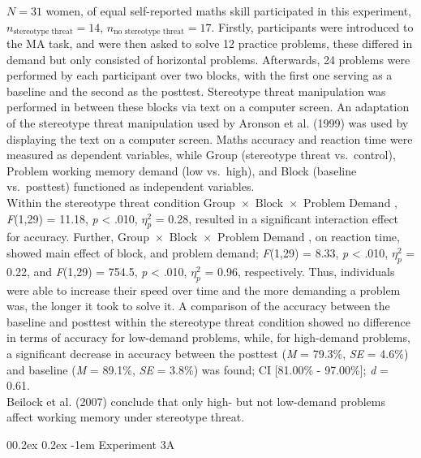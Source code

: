 \documentclass[
  stu,floatsintext]{apa7}
\makeatletter
\let\oldparagraph\paragraph
\renewcommand{\paragraph}[1]{\oldparagraph{#1}\mbox{}}
\renewcommand{\paragraph}{\@startsection{paragraph}{4}{\parindent}%
  {0\baselineskip \@plus 0.2ex \@minus 0.2ex}%
  {-1em}%
  {\normalfont\normalsize\bfseries\itshape\typesectitle}}
\renewcommand{\paragraph}{\@startsection{paragraph}{4}{\parindent}%
  {0\baselineskip \@plus 0.2ex \@minus 0.2ex}%
  {-1em}%
  {\normalfont\normalsize\bfseries\typesectitle}}
\makeatother
\begin{document}
\(N = 31\) women, of equal self-reported maths skill participated in this experiment, \(n_{\text{stereotype threat}} = 14\), \(n_{\text{no stereotype threat}} = 17\).
Firstly, participants were introduced to the MA task, and were then asked to solve 12 practice problems, these differed in demand but only consisted of horizontal problems.
Afterwards, 24 problems were performed by each participant over two blocks, with the first one serving as a baseline and the second as the posttest.
Stereotype threat manipulation was performed in between these blocks via text on a computer screen.
An adaptation of the stereotype threat manipulation used by Aronson et al. (1999) was used by displaying the text on a computer screen.
Maths accuracy and reaction time were measured as dependent variables, while Group (stereotype threat vs.~control), Problem working memory demand (low vs.~high), and Block (baseline vs.~posttest) functioned as independent variables.\\
Within the stereotype threat condition \(\text{Group } \times \text{ Block } \times \text{ Problem Demand }\), \emph{F}(1,29) = 11.18, \emph{p} \textless{} .010, \(\eta^{2}_{p}\) = 0.28, resulted in a significant interaction effect for accuracy.
Further, \(\text{Group } \times \text{ Block } \times \text{ Problem Demand }\), on reaction time, showed main effect of block, and problem demand; \emph{F}(1,29) = 8.33, \emph{p} \textless{} .010, \(\eta^{2}_{p}\) = 0.22, and \emph{F}(1,29) = 754.5, \emph{p} \textless{} .010, \(\eta^{2}_{p}\) = 0.96, respectively.
Thus, individuals were able to increase their speed over time and the more demanding a problem was, the longer it took to solve it.
A comparison of the accuracy between the baseline and posttest within the stereotype threat condition showed no difference in terms of accuracy for low-demand problems, while, for high-demand problems, a significant decrease in accuracy between the posttest (\emph{M} = 79.3\%, \emph{SE} = 4.6\%) and baseline (\emph{M} = 89.1\%, \emph{SE} = 3.8\%) was found; CI {[}81.00\% - 97.00\%{]}; \emph{d} = 0.61.\\
Beilock et al. (2007) conclude that only high- but not low-demand problems affect working memory under stereotype threat.

\paragraph{Experiment 3A}\label{experiment-3a}
\end{document}
